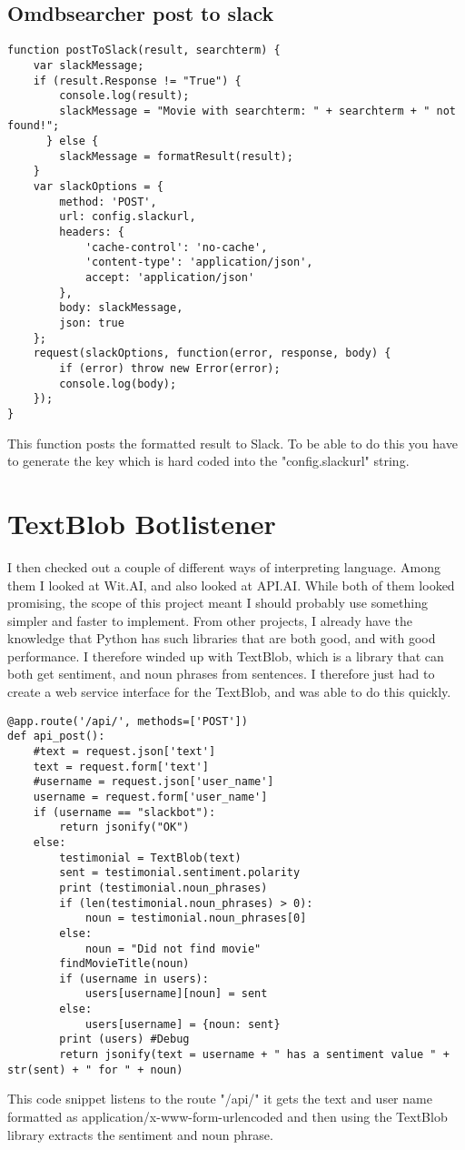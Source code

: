 \documentclass[11pt,fleqn]{book} %
\begin{document}
\subsection{Omdbsearcher post to slack}
\begin{verbatim}
function postToSlack(result, searchterm) {
    var slackMessage;
    if (result.Response != "True") {
        console.log(result);
        slackMessage = "Movie with searchterm: " + searchterm + " not found!";
      } else {
        slackMessage = formatResult(result);
    }
    var slackOptions = {
        method: 'POST',
        url: config.slackurl,
        headers: {
            'cache-control': 'no-cache',
            'content-type': 'application/json',
            accept: 'application/json'
        },
        body: slackMessage,
        json: true
    };
    request(slackOptions, function(error, response, body) {
        if (error) throw new Error(error);
        console.log(body);
    });
}
\end{verbatim}
This function posts the formatted result to Slack. To be able to do this you have to generate the key which is hard coded into the "config.slackurl" string.  

\section{TextBlob Botlistener}
I then checked out a couple of different ways of interpreting language. Among them I looked at Wit.AI\cite{Wit.aiWit.ai}, and also looked at API.AI\cite{API.AIConversationalAPI.AI}. While both of them looked promising, the scope of this project meant I should probably use something simpler and faster to implement. 
From other projects, I already have the knowledge that Python has such libraries that are both good, and with good performance. I therefore winded up with TextBlob, which is a library that can both get sentiment, and noun phrases\cite{WikipediaNounPhrase} from sentences. \cite{TextBlobTutorial:Documentation} 
I therefore just had to create a web service interface for the TextBlob, and was able to do this quickly.
\newpage
\begin{verbatim}
@app.route('/api/', methods=['POST'])
def api_post():
    #text = request.json['text']
    text = request.form['text']
    #username = request.json['user_name']
    username = request.form['user_name']
    if (username == "slackbot"):
        return jsonify("OK")
    else:
        testimonial = TextBlob(text)
        sent = testimonial.sentiment.polarity
        print (testimonial.noun_phrases)
        if (len(testimonial.noun_phrases) > 0):
            noun = testimonial.noun_phrases[0]
        else:
            noun = "Did not find movie"
        findMovieTitle(noun)
        if (username in users):
            users[username][noun] = sent
        else:
            users[username] = {noun: sent}
        print (users) #Debug
        return jsonify(text = username + " has a sentiment value " + str(sent) + " for " + noun)
\end{verbatim}
This code snippet listens to the route "/api/" it gets the text and user name formatted as application/x-www-form-urlencoded and then using the TextBlob library extracts the sentiment\cite{WikipediaSentimentAnalysis} and noun phrase\cite{WikipediaNounPhrase}.
\end{document}
